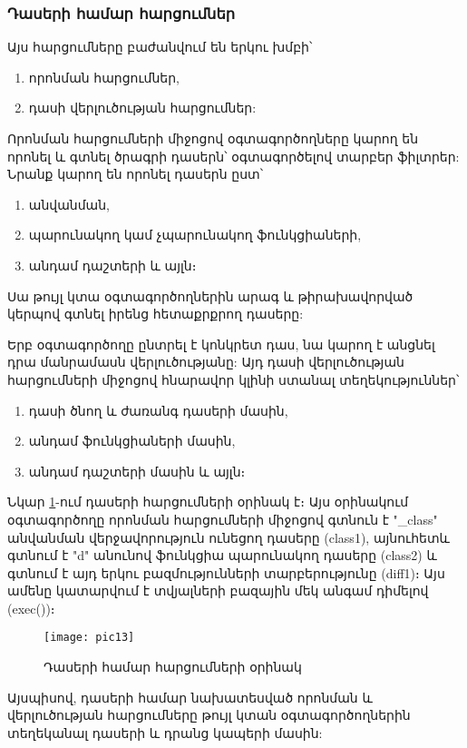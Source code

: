 \subsubsection*{Դասերի համար հարցումներ}\label{subsubsec:classes}

Այս հարցումները բաժանվում են երկու խմբի՝
\begin{enumerate}
    \item որոնման հարցումներ,
    \item դասի վերլուծության հարցումներ:
\end{enumerate}

Որոնման հարցումների միջոցով օգտագործողները կարող են որոնել և գտնել ծրագրի դասերն՝ օգտագործելով տարբեր ֆիլտրեր:
Նրանք կարող են որոնել դասերն ըստ՝
\begin{enumerate}
    \item անվանման,
    \item պարունակող կամ չպարունակող ֆունկցիաների,
    \item անդամ դաշտերի և այլն։
\end{enumerate}

Սա թույլ կտա օգտագործողներին արագ և թիրախավորված կերպով գտնել իրենց հետաքրքրող դասերը:

Երբ օգտագործողը ընտրել է կոնկրետ դաս, նա կարող է անցնել դրա մանրամասն վերլուծությանը: Այդ դասի վերլուծության
հարցումների միջոցով հնարավոր կլինի ստանալ տեղեկություններ՝
\begin{enumerate}
    \item դասի ծնող և ժառանգ դասերի մասին,
    \item անդամ ֆունկցիաների մասին,
    \item անդամ դաշտերի մասին և այլն։
\end{enumerate}

Նկար \ref{fig:figure13}-ում դասերի հարցումների օրինակ է։ Այս օրինակում օգտագործողը որոնման հարցումների միջոցով գտնուն է
"\_class" անվանման վերջավորություն ունեցող դասերը (class1), այնուհետև գտնում է "d" անունով ֆունկցիա պարունակող դասերը (class2)
և գտնում է այդ երկու բազմությունների տարբերությունը (diff1)։ Այս ամենը կատարվում է տվյալների բազային մեկ անգամ դիմելով (exec())։

\begin{figure}[h]
    \centering
    \texttt{[image: pic13]}
    \caption{Դասերի համար հարցումների օրինակ}
    \label{fig:figure13}
\end{figure}

Այսպիսով, դասերի համար նախատեսված որոնման և վերլուծության հարցումները թույլ կտան օգտագործողներին տեղեկանալ դասերի
և դրանց կապերի մասին:
